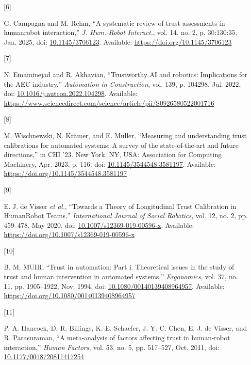 \documentclass[
  letterpaper,
  DIV=11,
  numbers=noendperiod]{scrartcl}
\newlength{\cslhangindent}
\newlength{\csllabelwidth}
\newenvironment{CSLReferences}[2] %
 {\begin{list}{}{%
  \setlength{\itemindent}{0pt}
  \setlength{\leftmargin}{0pt}
  \setlength{\parsep}{0pt}
  \ifodd #1
   \setlength{\leftmargin}{\cslhangindent}
   \setlength{\itemindent}{-1\cslhangindent}
  \fi
  \setlength{\itemsep}{#2\baselineskip}}}
 {\end{list}}
\newcommand{\CSLLeftMargin}[1]{\parbox[t]{\csllabelwidth}{\strut#1\strut}}
\newcommand{\CSLRightInline}[1]{\parbox[t]{\linewidth - \csllabelwidth}{\strut#1\strut}}
\begin{document}
\begin{CSLReferences}{0}{0}
\CSLLeftMargin{{[}6{]} }%
\CSLRightInline{G. Campagna and M. Rehm, {``A systematic review of trust
assessments in human{\textendash}robot interaction,''} \emph{J.
Hum.-Robot Interact.}, vol. 14, no. 2, p. 30:130:35, Jan. 2025, doi:
\href{https://doi.org/10.1145/3706123}{10.1145/3706123}. Available:
\url{https://doi.org/10.1145/3706123}}

\CSLLeftMargin{{[}7{]} }%
\CSLRightInline{N. Emaminejad and R. Akhavian, {``Trustworthy AI and
robotics: Implications for the AEC industry,''} \emph{Automation in
Construction}, vol. 139, p. 104298, Jul. 2022, doi:
\href{https://doi.org/10.1016/j.autcon.2022.104298}{10.1016/j.autcon.2022.104298}.
Available:
\url{https://www.sciencedirect.com/science/article/pii/S0926580522001716}}

\CSLLeftMargin{{[}8{]} }%
\CSLRightInline{M. Wischnewski, N. Krämer, and E. Müller, {``Measuring
and understanding trust calibrations for automated systems: A survey of
the state-of-the-art and future directions,''} in CHI '23. New York, NY,
USA: Association for Computing Machinery, Apr. 2023, p. 116. doi:
\href{https://doi.org/10.1145/3544548.3581197}{10.1145/3544548.3581197}.
Available: \url{https://doi.org/10.1145/3544548.3581197}}

\CSLLeftMargin{{[}9{]} }%
\CSLRightInline{E. J. de Visser \emph{et al.}, {``Towards a Theory of
Longitudinal Trust Calibration in Human{\textendash}Robot Teams,''}
\emph{International Journal of Social Robotics}, vol. 12, no. 2, pp.
459--478, May 2020, doi:
\href{https://doi.org/10.1007/s12369-019-00596-x}{10.1007/s12369-019-00596-x}.
Available: \url{https://doi.org/10.1007/s12369-019-00596-x}}

\CSLLeftMargin{{[}10{]} }%
\CSLRightInline{B. M. MUIR, {``Trust in automation: Part i. Theoretical
issues in the study of trust and human intervention in automated
systems,''} \emph{Ergonomics}, vol. 37, no. 11, pp. 1905--1922, Nov.
1994, doi:
\href{https://doi.org/10.1080/00140139408964957}{10.1080/00140139408964957}.
Available: \url{https://doi.org/10.1080/00140139408964957}}

\CSLLeftMargin{{[}11{]} }%
\CSLRightInline{P. A. Hancock, D. R. Billings, K. E. Schaefer, J. Y. C.
Chen, E. J. de Visser, and R. Parasuraman, {``A meta-analysis of factors
affecting trust in human-robot interaction,''} \emph{Human Factors},
vol. 53, no. 5, pp. 517--527, Oct. 2011, doi:
\href{https://doi.org/10.1177/0018720811417254}{10.1177/0018720811417254}}


\end{CSLReferences}
\end{document}
